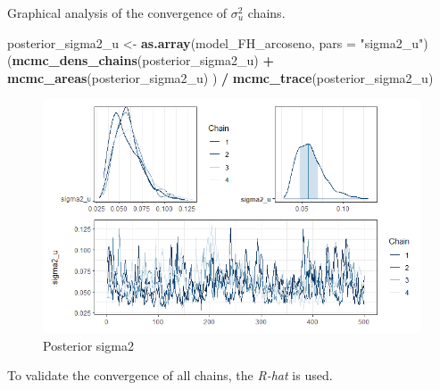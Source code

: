 \documentclass[
  12pt,
]{book}
\newenvironment{Shaded}{\begin{snugshade}}{\end{snugshade}}
\newcommand{\AttributeTok}[1]{\textcolor[rgb]{0.13,0.29,0.53}{#1}}
\newcommand{\FunctionTok}[1]{\textcolor[rgb]{0.13,0.29,0.53}{\textbf{#1}}}
\newcommand{\NormalTok}[1]{#1}
\newcommand{\OtherTok}[1]{\textcolor[rgb]{0.56,0.35,0.01}{#1}}
\newcommand{\SpecialCharTok}[1]{\textcolor[rgb]{0.81,0.36,0.00}{\textbf{#1}}}
\newcommand{\StringTok}[1]{\textcolor[rgb]{0.31,0.60,0.02}{#1}}
\begin{document}
Graphical analysis of the convergence of \(\sigma^2_u\) chains.

\begin{Shaded}
\begin{Highlighting}[]
\NormalTok{posterior\_sigma2\_u }\OtherTok{\textless{}{-}} \FunctionTok{as.array}\NormalTok{(model\_FH\_arcoseno, }\AttributeTok{pars =} \StringTok{"sigma2\_u"}\NormalTok{)}
\NormalTok{(}\FunctionTok{mcmc\_dens\_chains}\NormalTok{(posterior\_sigma2\_u) }\SpecialCharTok{+}
    \FunctionTok{mcmc\_areas}\NormalTok{(posterior\_sigma2\_u) ) }\SpecialCharTok{/} 
  \FunctionTok{mcmc\_trace}\NormalTok{(posterior\_sigma2\_u)}
\end{Highlighting}
\end{Shaded}

\begin{figure}
\centering
\includegraphics{Recursos/04_FH_Arcosin/04_sigma2.png}
\caption{Posterior sigma2}
\end{figure}

To validate the convergence of all chains, the \emph{R-hat} is used.

\begin{Shaded}
\end{Shaded}
\end{document}
